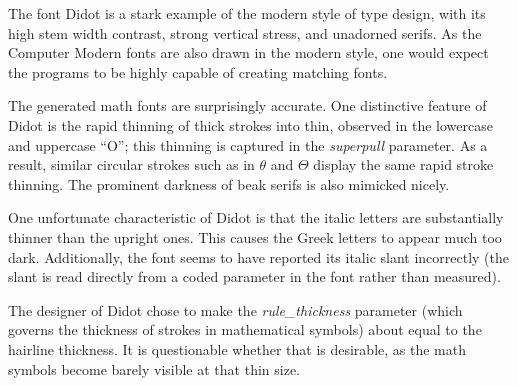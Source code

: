 
The font Didot is a stark example of the modern style of type design, with its
high stem width contrast, strong vertical stress, and unadorned serifs. As the
Computer Modern fonts are also drawn in the modern style, one would expect the
programs to be highly capable of creating matching fonts.

The generated math fonts are surprisingly accurate. One distinctive feature of
Didot is the rapid thinning of thick strokes into thin, observed in the
lowercase and uppercase ``O''; this thinning is captured in the \emph{superpull}
parameter. As a result, similar circular strokes such as in $\theta$ and
$\Theta$ display the same rapid stroke thinning. The prominent darkness of beak
serifs is also mimicked nicely.

One unfortunate characteristic of Didot is that the italic letters are
substantially thinner than the upright ones. This causes the Greek letters to
appear much too dark. Additionally, the font seems to have reported its italic
slant incorrectly (the slant is read directly from a coded parameter in the font
rather than measured).

The designer of Didot chose to make the \emph{rule\_thickness} parameter (which
governs the thickness of strokes in mathematical symbols) about equal to the
hairline thickness. It is questionable whether that is desirable, as the math
symbols become barely visible at that thin size.
